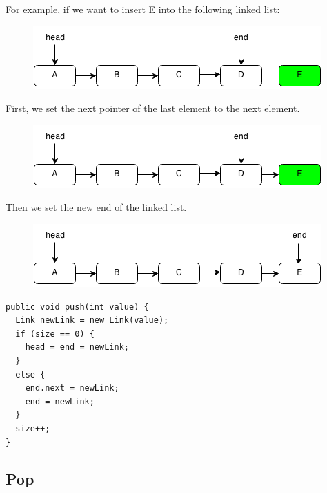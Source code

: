 \documentclass[11pt,oneside]{book}
\makeatletter
\def\maxwidth#1{\ifdim\Gin@nat@width>#1 #1\else\Gin@nat@width\fi}
\makeatother
\begin{document}
For example, if we want to insert E into the following linked list:

\vspace{5px}\begin{figure}[H]\centering
        \includegraphics[width=0.66\maxwidth{\textwidth}]{linkedlistpush.png}
        \end{figure}

First, we set the next pointer of the last element to the next element.

\vspace{5px}\begin{figure}[H]\centering
        \includegraphics[width=0.66\maxwidth{\textwidth}]{linkedlistpush2.png}
        \end{figure}

Then we set the new end of the linked list.

\vspace{5px}\begin{figure}[H]\centering
        \includegraphics[width=0.66\maxwidth{\textwidth}]{linkedlistpush3.png}
        \end{figure}

\begin{lstlisting}
public void push(int value) {
  Link newLink = new Link(value);
  if (size == 0) {
    head = end = newLink;
  }
  else {
    end.next = newLink;
    end = newLink;
  }
  size++;
}
\end{lstlisting}

\subsection{Pop}
\end{document}

